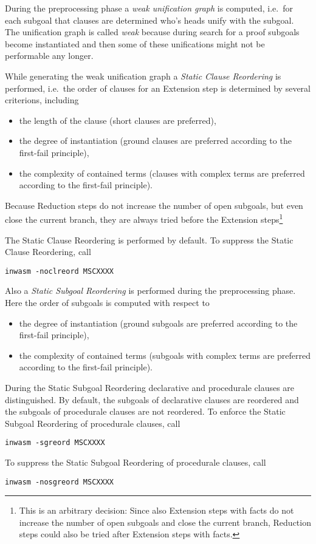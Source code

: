 During the preprocessing phase a {\em weak unification graph\/} is
computed, i.e.\ for each subgoal that clauses are determined who's
heads unify with the subgoal. The unification graph is called {\em
weak\/} because during search for a proof subgoals become
instantiated and then some of these unifications might not be
performable any longer.

While generating the weak unification graph a {\em Static Clause
Reordering\/} is performed, i.e.\ the order of clauses for an
Extension step is determined by several criterions, including 
\begin{itemize}
\item the length of the clause (short clauses are preferred),
\item the degree of instantiation (ground clauses are preferred
	according to the first-fail principle),
\item the complexity of contained terms (clauses with complex
      terms are preferred according to the first-fail principle).  
\end{itemize}
Because Reduction steps do not increase the number of open subgoals,
but even close the current branch, they are always tried before the
Extension steps\footnote{This is an arbitrary decision: Since also
Extension steps with facts do not increase the number of open subgoals
and close the current branch, Reduction steps could also be tried
after Extension steps with facts.}

The Static Clause Reordering is performed by default. To suppress the
Static Clause Reordering, call
\begin{center}
\begin{verbatim}
inwasm -noclreord MSCXXXX
\end{verbatim}
\end{center}

Also a {\em Static Subgoal Reordering\/} is performed during the
preprocessing phase. Here the order of subgoals is computed with
respect to  
\begin{itemize}
\item the degree of instantiation (ground subgoals are preferred
	according to the first-fail principle),
\item the complexity of contained terms (subgoals with complex
	terms are preferred according to the first-fail principle).  
\end{itemize}

During the Static Subgoal Reordering declarative and procedurale
clauses are distinguished. By default, the subgoals of declarative
clauses are reordered and the subgoals of procedurale clauses are not
reordered. To enforce the Static Subgoal Reordering of procedurale
clauses, call
\begin{center}
\begin{verbatim}
inwasm -sgreord MSCXXXX
\end{verbatim}
\end{center}
To suppress the Static Subgoal Reordering of procedurale clauses, call
\begin{center}
\begin{verbatim}
inwasm -nosgreord MSCXXXX
\end{verbatim}
\end{center}

